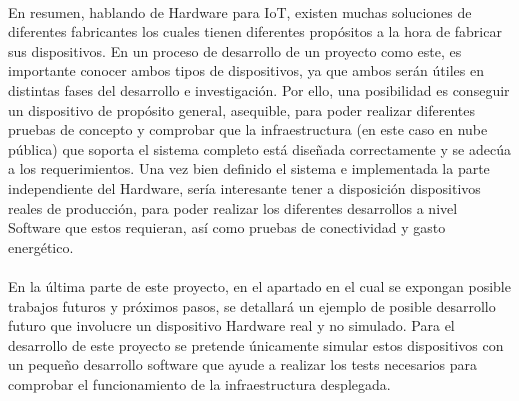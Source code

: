 \documentclass[../../memoria.tex]{subfiles}
\begin{document}
\paragraph{}
En resumen, hablando de Hardware para IoT, existen muchas soluciones de diferentes fabricantes los cuales tienen diferentes propósitos a la hora de fabricar sus dispositivos. En un proceso de desarrollo de un proyecto como este, es importante conocer ambos tipos de dispositivos, ya que ambos serán útiles en distintas fases del desarrollo e investigación. Por ello, una posibilidad es conseguir un dispositivo de propósito general, asequible, para poder realizar diferentes pruebas de concepto y comprobar que la infraestructura (en este caso en nube pública) que soporta el sistema completo está diseñada correctamente y se adecúa a los requerimientos. Una vez bien definido el sistema e implementada la parte independiente del Hardware, sería interesante tener a disposición dispositivos reales de producción, para poder realizar los diferentes desarrollos a nivel Software que estos requieran, así como pruebas de conectividad y gasto energético.

\paragraph{}
En la última parte de este proyecto, en el apartado en el cual se expongan posible trabajos futuros y próximos pasos, se detallará un ejemplo de posible desarrollo futuro que involucre un dispositivo Hardware real y no simulado. Para el desarrollo de este proyecto se pretende únicamente simular estos dispositivos con un pequeño desarrollo software que ayude a realizar los tests necesarios para comprobar el funcionamiento de la infraestructura desplegada.
\end{document}

